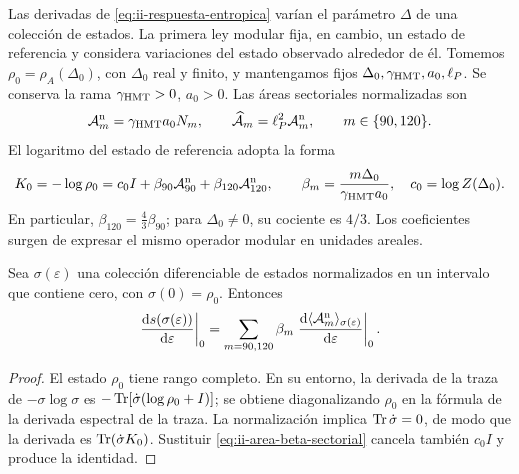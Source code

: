 Las derivadas de \eqref{eq:ii-respuesta-entropica} varían el parámetro
\(\Delta\) de una colección de estados. La primera ley modular fija,
en cambio, un estado de referencia y considera variaciones del estado
observado alrededor de él. Tomemos
\(\rho_0=\rho_A(\Delta_0)\), con \(\Delta_0\) real y finito,
y mantengamos fijos \(\Delta_0,\gamma_{\mathrm{HMT}},a_0,\ell_P\).
Se conserva la rama \(\gamma_{\mathrm{HMT}}>0\), \(a_0>0\).
Las áreas sectoriales normalizadas son
\begin{equation}
 \mathcal A_m^{\rm n}=\gamma_{\mathrm{HMT}}a_0N_m,
 \qquad
 \widehat{\mathcal A}_m=\ell_P^2\mathcal A_m^{\rm n},
 \qquad m\in\{90,120\}.
 \label{eq:ii-area-sector-normalizado}
\end{equation}
El logaritmo del estado de referencia adopta la forma
\begin{equation}
 K_0=-\log\rho_0
 =c_0I+\beta_{90}\mathcal A_{90}^{\rm n}
         +\beta_{120}\mathcal A_{120}^{\rm n},
 \qquad
 \beta_m=\frac{m\Delta_0}{\gamma_{\mathrm{HMT}}a_0},
 \quad c_0=\log Z(\Delta_0).
 \label{eq:ii-area-beta-sectorial}
\end{equation}
En particular, \(\beta_{120}=\tfrac43\beta_{90}\); para
\(\Delta_0\ne0\), su cociente es \(4/3\). Los coeficientes
surgen de expresar el mismo operador modular en unidades areales.

\begin{theorem}
\label{thm:ii-area-primera-ley}
Sea \(\sigma(\varepsilon)\) una colección diferenciable de estados
normalizados en un intervalo que contiene cero, con
\(\sigma(0)=\rho_0\). Entonces
\begin{equation}
 \left.\frac{\mathrm d s(\sigma(\varepsilon))}{\mathrm d\varepsilon}\right|_0
 =\sum_{m=90,120}\beta_m
   \left.\frac{\mathrm d\langle\mathcal A_m^{\rm n}\rangle_
                       {\sigma(\varepsilon)}}{\mathrm d\varepsilon}\right|_0.
 \label{eq:ii-area-primera-ley}
\end{equation}
\end{theorem}
\begin{proof}
El estado \(\rho_0\) tiene rango completo. En su entorno, la derivada
de la traza de \(-\sigma\log\sigma\) es
\(-\operatorname{Tr}[\dot\sigma(\log\rho_0+I)]\); se obtiene diagonalizando
\(\rho_0\) en la fórmula de la derivada espectral de la traza.
La normalización implica \(\operatorname{Tr}\dot\sigma=0\), de modo que la
derivada es \(\operatorname{Tr}(\dot\sigma K_0)\). Sustituir
\eqref{eq:ii-area-beta-sectorial} cancela también \(c_0I\) y
produce la identidad.
\end{proof}

